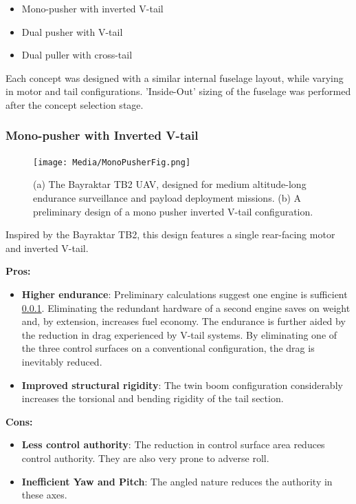 \documentclass[12pt]{article}
\begin{document}
	\begin{itemize}
		\item Mono-pusher with inverted V-tail
		\item Dual pusher with V-tail
		\item Dual puller with cross-tail
	\end{itemize}
	
	Each concept was designed with a similar internal fuselage layout, while varying in motor and tail configurations. 'Inside-Out' sizing of the fuselage was performed after the concept selection stage.
	
	\newpage
	
	\subsubsection{Mono-pusher with Inverted V-tail}
	\begin{figure}[h!]
		\centering
		\texttt{[image: Media/MonoPusherFig.png]} %
		\caption{(a) The Bayraktar TB2 UAV, designed for medium altitude-long endurance surveillance and payload deployment missions. (b) A preliminary design of a mono pusher inverted V-tail configuration.}
		\label{fig:mono_pusher}
	\end{figure}
	Inspired by the Bayraktar TB2, this design features a single rear-facing motor and inverted V-tail.
	
	\textbf{Pros:}
	\begin{itemize}
		\item \textbf{Higher endurance}: Preliminary calculations suggest one engine is sufficient \ref{}. Eliminating the redundant hardware of a second engine saves on weight and, by extension, increases fuel economy. The endurance is further aided by the reduction in drag experienced by V-tail systems. By eliminating one of the three control surfaces on a conventional configuration, the drag is inevitably reduced. 
		\item \textbf{Improved structural rigidity}: The twin boom configuration considerably increases the torsional and bending rigidity of the tail section.
	\end{itemize}
	
	\textbf{Cons:}
	\begin{itemize}
		\item \textbf{Less control authority}: The reduction in control surface area reduces control authority. They are also very prone to adverse roll.
		\item \textbf{Inefficient Yaw and Pitch}: The angled nature reduces the authority in these axes.
	\end{itemize}
	
\end{document}
